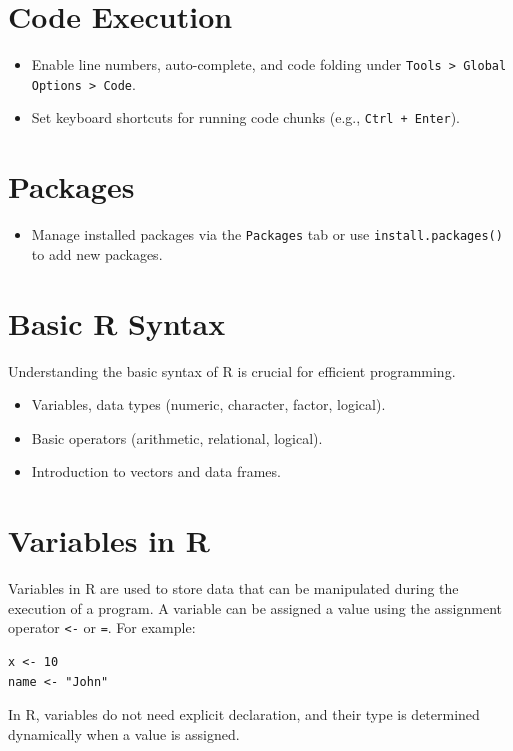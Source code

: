 \documentclass[12pt]{book}
\begin{document}
\section{Code Execution}
\begin{itemize}
    \item Enable line numbers, auto-complete, and code folding under \texttt{Tools > Global Options > Code}.
    \item Set keyboard shortcuts for running code chunks (e.g., \texttt{Ctrl + Enter}).
\end{itemize}

\section{Packages}
\begin{itemize}
    \item Manage installed packages via the \texttt{Packages} tab or use \texttt{install.packages()} to add new packages.
\end{itemize}





\section{Basic R Syntax}
Understanding the basic syntax of R is crucial for efficient programming.
\begin{itemize}
    \item Variables, data types (numeric, character, factor, logical).
    \item Basic operators (arithmetic, relational, logical).
    \item Introduction to vectors and data frames.
\end{itemize}





\section{Variables in R}
Variables in R are used to store data that can be manipulated during the execution of a program. A variable can be assigned a value using the assignment operator \texttt{<-} or \texttt{=}. For example:
\begin{verbatim}
x <- 10
name <- "John"
\end{verbatim}
In R, variables do not need explicit declaration, and their type is determined dynamically when a value is assigned.
\end{document}
